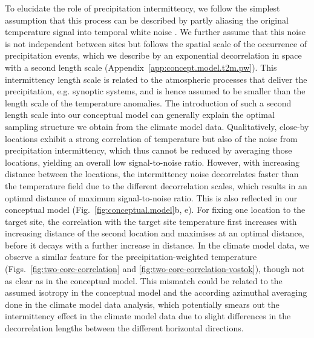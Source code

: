 \documentclass[cp, manuscript]{copernicus}
\begin{document}
To elucidate the role of precipitation intermittency, we follow the simplest
assumption that this process can be described by partly aliasing the original
temperature signal into temporal white noise \citep{Laepple2018,Casado2019}. We
further assume that this noise is not independent between sites but follows the
spatial scale of the occurrence of precipitation events, which we describe by an
exponential decorrelation in space with a second length scale
(Appendix~\ref{app:concept.model.t2m.pw}). This intermittency length scale is
related to the atmospheric processes that deliver the precipitation,
e.g. synoptic systems, and is hence assumed to be smaller than the length scale
of the temperature anomalies. The introduction of such a second length scale
into our conceptual model can generally explain the optimal sampling structure
we obtain from the climate model data. Qualitatively, close-by locations exhibit
a strong correlation of temperature but also of the noise from precipitation
intermittency, which thus cannot be reduced by averaging those locations,
yielding an overall low signal-to-noise ratio. However, with increasing distance
between the locations, the intermittency noise decorrelates faster than the
temperature field due to the different decorrelation scales, which results in an
optimal distance of maximum signal-to-noise ratio. This is also reflected in our
conceptual model (Fig.~\ref{fig:conceptual.model}b, e). For fixing one location
to the target site, the correlation with the target site temperature first
increases with increasing distance of the second location and maximises at an
optimal distance, before it decays with a further increase in distance. In the
climate model data, we observe a similar feature for the precipitation-weighted
temperature (Figs.~\ref{fig:two-core-correlation} and
\ref{fig:two-core-correlation-vostok}), though not as clear as in the conceptual
model. This mismatch could be related to the assumed isotropy in the conceptual
model and the according azimuthal averaging done in the climate model data
analysis, which potentially smears out the intermittency effect in the climate
model data due to slight differences in the decorrelation lengths between the
different horizontal directions.
\end{document}
